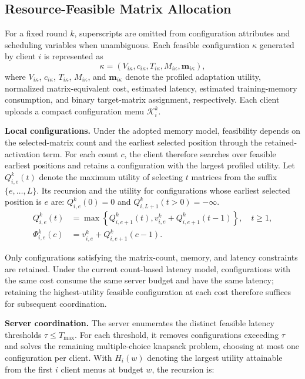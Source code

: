 \documentclass[10pt,conference,letterpaper]{IEEEtran}
\begin{document}
\subsection{Resource-Feasible Matrix Allocation}\label{sec:fm-allocation}
For a fixed round \(k\), superscripts are omitted from configuration attributes and scheduling variables when unambiguous. Each feasible configuration \(\kappa\) generated by client \(i\) is represented as
\[
\kappa=(V_{i\kappa},c_{i\kappa},T_{i\kappa},M_{i\kappa},\mathbf m_{i\kappa}),
\]
where \(V_{i\kappa}\), \(c_{i\kappa}\), \(T_{i\kappa}\), \(M_{i\kappa}\), and \(\mathbf m_{i\kappa}\) denote the profiled adaptation utility, normalized matrix-equivalent cost, estimated latency, estimated training-memory consumption, and binary target-matrix assignment, respectively. Each client uploads a compact configuration menu \(\mathcal K_i^k\).

\noindent\textbf{Local configurations.}
Under the adopted memory model, feasibility depends on the selected-matrix count and the earliest selected position through the retained-activation term. For each count $c$, the client therefore searches over feasible earliest positions and retains a configuration with the largest profiled utility. Let $Q_{i,e}^k(t)$ denote the maximum utility of selecting $t$ matrices from the suffix $\{e,\ldots,L\}$. Its recursion and the utility for configurations whose earliest selected position is $e$ are:
\(Q_{i,e}^k(0)=0\) and \(Q_{i,L+1}^k(t>0)=-\infty\).
\begin{equation}
 \begin{aligned}
 Q_{i,e}^k(t)&=\max\left\{Q_{i,e+1}^k(t),v_{i,e}^k+Q_{i,e+1}^k(t-1)\right\},\quad t\ge1,
 \\
 \Phi_{i,e}^k(c)&=v_{i,e}^k+Q_{i,e+1}^k(c-1).
 \end{aligned}
 \label{eq:client-dp}
\end{equation}

Only configurations satisfying the matrix-count, memory, and latency constraints are retained. Under the current count-based latency model, configurations with the same cost consume the same server budget and have the same latency; retaining the highest-utility feasible configuration at each cost therefore suffices for subsequent coordination.

\noindent\textbf{Server coordination.}
The server enumerates the distinct feasible latency thresholds $\tau\le T_{\max}$. For each threshold, it removes configurations exceeding $\tau$ and solves the remaining multiple-choice knapsack problem, choosing at most one configuration per client. With $H_i(w)$ denoting the largest utility attainable from the first $i$ client menus at budget $w$, the recursion is:
\end{document}

